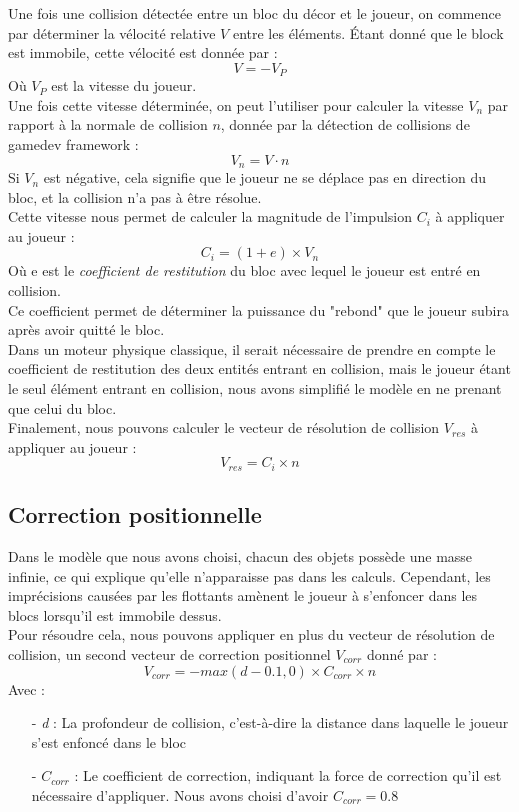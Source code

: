 \documentclass[10pt]{report}
\begin{document}
Une fois une collision détectée entre un bloc du décor et le joueur, on commence par déterminer la vélocité relative \(V\) entre les éléments.
Étant donné que le block est immobile, cette vélocité est donnée par :
\[ V =  - V_{P} \]
Où \(V_{P}\) est la vitesse du joueur.\\
Une fois cette vitesse déterminée, on peut l'utiliser pour calculer la vitesse \(V_{n}\) par rapport à la normale de collision \(n\), donnée par la détection de collisions de gamedev framework :
\[ V_{n} = V \cdot n \]
Si \(V_{n}\) est négative, cela signifie que le joueur ne se déplace pas en direction du bloc, et la collision n'a pas à être résolue.\\
Cette vitesse nous permet de calculer la magnitude de l'impulsion \(C_{i}\) à appliquer au joueur :\\
\[ C_{i} = (1 + e) \times V_{n} \]
Où e est le \emph{coefficient de restitution} du bloc avec lequel le joueur est entré en collision.\\
Ce coefficient permet de déterminer la puissance du "rebond" que le joueur subira après avoir quitté le bloc.\\
Dans un moteur physique classique, il serait nécessaire de prendre en compte le coefficient de restitution des deux entités entrant en collision, mais le joueur étant le seul élément entrant en collision, nous avons simplifié le modèle en ne prenant que celui du bloc.\\
Finalement, nous pouvons calculer le vecteur de résolution de collision \(V_{res}\) à appliquer au joueur :
\[V_{res} = C_{i} \times n \]

\subsection{Correction positionnelle}
Dans le modèle que nous avons choisi, chacun des objets possède une masse infinie, ce qui explique qu'elle n'apparaisse pas dans les calculs. Cependant, les imprécisions causées par les flottants amènent le joueur à s'enfoncer dans les blocs lorsqu'il est immobile dessus.\\
Pour résoudre cela, nous pouvons appliquer en plus du vecteur de résolution de collision, un second vecteur de correction positionnel \(V_{corr}\) donné par :
\[V_{corr} = -max(d-0.1,0) \times C_{corr} \times n\]
Avec :\\
\begin{itemize}
  \item[-] \emph{d} : La profondeur de collision, c'est-à-dire la distance dans laquelle le joueur s'est enfoncé dans le bloc
  \item[-] \(C_{corr}\) : Le coefficient de correction, indiquant la force de correction qu'il est nécessaire d'appliquer. Nous avons choisi d'avoir \(C_{corr}=0.8\)
\end{itemize}
\end{document}
